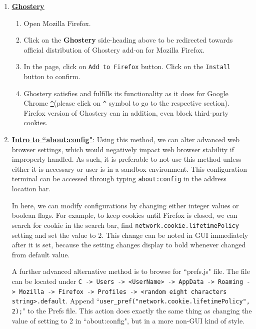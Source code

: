 \documentclass[12pt]{extarticle}
\begin{document}
\begin{enumerate}
	\vspace{2mm}
	\noindent
	\item	\href{https://addons.mozilla.org/en-US/firefox/addon/ghostery/}{\textbf{\underline{Ghostery}}}
	
	\begin{enumerate}
		\item Open Mozilla Firefox.
		\item Click on the \textbf{Ghostery} side-heading above to be redirected towards official distribution of Ghostery add-on for Mozilla Firefox.
		\item In the page, click on \texttt{Add to Firefox} button. Click on the \texttt{Install} button to confirm.
		\item Ghostery satisfies and fulfills its functionality as it does for Google Chrome {\hyperref[slide 8]{\texttt{\^}}}(please click on \texttt{\^} symbol to go to the respective section). Firefox version of Ghostery can in addition, even block third-party cookies.
	\end{enumerate}
	
	
	
	\vspace{2mm}
	\noindent
	\item \href{about:config}{\textbf{Intro to ``\underline{about:config}"}}:
	Using this method, we can alter advanced web browser settings, which would negatively impact web browser stability if improperly handled. As such, it is preferable to not use this method unless either it is necessary or user is in a sandbox environment. This configuration terminal can be accessed through typing \texttt{about:config} in the address location bar.
	
	\vspace{2mm}
	In here, we can modify configurations by changing either integer values or boolean flags. For example, to keep cookies until Firefox is closed, we can search for cookie in the search bar, find \texttt{network.cookie.lifetimePolicy} setting and set the value to 2. This change can be noted in GUI immediately after it is set, because the setting changes display to bold whenever changed from default value. 
	
	\vspace{2mm}
	A further advanced alternative method is to browse for ``prefs.js" file. The file can be located under \texttt{C -> Users -> <UserName> -> AppData -> Roaming -> Mozilla -> Firefox -> Profiles -> <random eight characters \\string>.default}. Append ``\texttt{user\_pref("network.cookie.lifetimePolicy", 2);}" to the Prefs file. This action does exactly the same thing as changing the value of setting to 2 in ``about:config", but in a more non-GUI kind of style.
	\end{enumerate}
\end{document}
